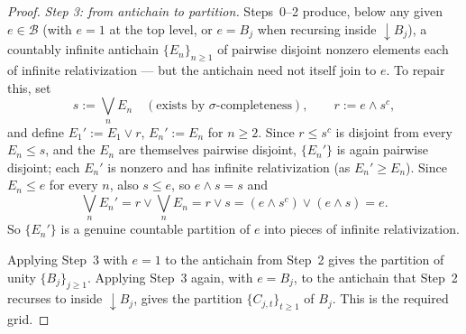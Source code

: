 \documentclass[10pt,a4paper]{amsart}
\begin{document}
\begin{proof}
\emph{Step 3: from antichain to partition.} Steps~0--2 produce, below
any given $e\in\mathcal B$ (with $e=1$ at the top level, or $e=B_j$ when
recursing inside ${\downarrow}B_j$), a countably infinite antichain
$\{E_n\}_{n\geq1}$ of pairwise disjoint nonzero elements each of
infinite relativization --- but the antichain need not itself join to
$e$. To repair this, set
\[
s:=\bigvee_nE_n\quad(\text{exists by }\sigma\text{-completeness}),
\qquad
r:=e\wedge s^c,
\]
and define $E_1':=E_1\vee r$, $E_n':=E_n$ for $n\geq2$. Since $r\leq
s^c$ is disjoint from every $E_n\leq s$, and the $E_n$ are themselves
pairwise disjoint, $\{E_n'\}$ is again pairwise disjoint; each $E_n'$ is
nonzero and has infinite relativization (as $E_n'\geq E_n$). Since
$E_n\leq e$ for every $n$, also $s\leq e$, so $e\wedge s=s$ and
\[
\bigvee_nE_n'=r\vee\bigvee_nE_n=r\vee s=(e\wedge s^c)\vee(e\wedge s)=e.
\]
So $\{E_n'\}$ is a genuine countable partition of $e$ into pieces of
infinite relativization.

Applying Step~3 with $e=1$ to the antichain from Step~2 gives the
partition of unity $\{B_j\}_{j\geq1}$. Applying Step~3 again, with
$e=B_j$, to the antichain that Step~2 recurses to inside
${\downarrow}B_j$, gives the partition $\{C_{j,t}\}_{t\geq1}$ of $B_j$.
This is the required grid.
\end{proof}
\end{document}
